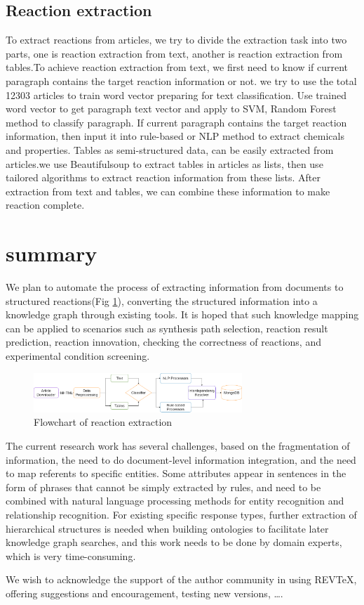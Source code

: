 \documentclass[%
 aip,
 jmp,%
 amsmath,amssymb,
 reprint,%
]{revtex4-2}
\begin{document}
\subsection{Reaction extraction}
To extract reactions from articles, we try to divide the extraction task into two parts, one is reaction extraction from text, 
another is reaction extraction from tables.To achieve reaction extraction from text, we first need to know if current paragraph
contains the target reaction information or not.
we try to use the total 12303 articles to train word vector preparing for text classification.
Use trained word vector to get paragraph text vector and apply to SVM, Random Forest method to classify paragraph.
If current paragraph contains the target reaction information, then input it into rule-based or NLP method to extract
chemicals and properties.
Tables as semi-structured data, can be easily extracted from articles.we use Beautifulsoup to extract tables in articles as lists,
then use tailored algorithms to extract reaction information from these lists. 
After extraction from text and tables, we can combine these information to make reaction complete.

\section{summary}
We plan to automate the process of extracting information from documents to structured reactions(Fig \ref{ Fig.7 }), 
converting the structured information into a knowledge graph through existing tools. It is hoped that such knowledge 
mapping can be applied to scenarios such as synthesis path
selection, reaction result prediction, reaction innovation, checking the correctness of reactions, and experimental condition screening.
\begin{figure}[htbp]
 \centering
 \includegraphics[width=0.7\textwidth]{figure/7.png}
 \caption{ Flowchart of reaction extraction }
 \label{ Fig.7 }
\end{figure}
The current research work has several challenges, based on the fragmentation of information, the need to do document-level information 
integration, and the need to map referents to specific entities. Some attributes appear in sentences in the form of phrases that cannot 
be simply extracted by rules, and need to be combined with natural language processing methods for entity recognition and relationship 
recognition. For existing specific response types, further extraction of hierarchical structures is needed when building ontologies to 
facilitate later knowledge graph searches, and this work needs to be done by domain experts, which is very time-consuming.

\begin{acknowledgments}
We wish to acknowledge the support of the author community in using
REV\TeX{}, offering suggestions and encouragement, testing new versions,
\dots.
\end{acknowledgments}

\nocite{*}
\end{document}

